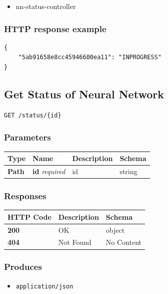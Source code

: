 \begin{itemize}
\tightlist
\item
  nn-status-controller
\end{itemize}

\subsubsection{HTTP response example}\label{http-response-example}

\begin{verbatim}
{
    "5ab91658e8cc45946600ea11": "INPROGRESS"
}
\end{verbatim}

\subsection{Get Status of Neural
Network}\label{get-status-of-neural-network}

\begin{verbatim}
GET /status/{id}
\end{verbatim}

\subsubsection{Parameters}\label{parameters-8}

\begin{longtable}[]{@{}llll@{}}
\toprule
Type & Name & Description & Schema\tabularnewline
\midrule
\endhead
\textbf{Path} & \textbf{id} \emph{required} & id & string\tabularnewline
\bottomrule
\end{longtable}

\subsubsection{Responses}\label{responses-11}

\begin{longtable}[]{@{}lll@{}}
\toprule
HTTP Code & Description & Schema\tabularnewline
\midrule
\endhead
\textbf{200} & OK & object\tabularnewline
\textbf{404} & Not Found & No Content\tabularnewline
\bottomrule
\end{longtable}

\subsubsection{Produces}\label{produces-11}

\begin{itemize}
\tightlist
\item
  \texttt{application/json}
\end{itemize}

